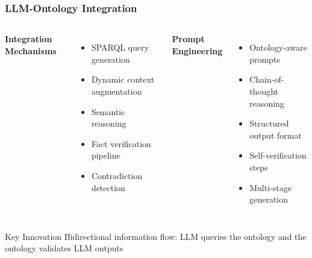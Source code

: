 \documentclass{beamer}
\begin{document}
\begin{frame}
\frametitle{LLM-Ontology Integration}

\begin{columns}

\textbf{Integration Mechanisms} \cite{scibite2024ontologies}
\begin{itemize}
    \item SPARQL query generation
    \item Dynamic context augmentation
    \item Semantic reasoning
    \item Fact verification pipeline
    \item Contradiction detection
\end{itemize}

\textbf{Prompt Engineering}
\begin{itemize}
    \item Ontology-aware prompts
    \item Chain-of-thought reasoning
    \item Structured output format
    \item Self-verification steps
    \item Multi-stage generation
\end{itemize}

\end{columns}

\begin{alertblock}{Key Innovation}
Bidirectional information flow: LLM queries the ontology and the ontology validates LLM outputs
\end{alertblock}
\end{frame}
\end{document}

